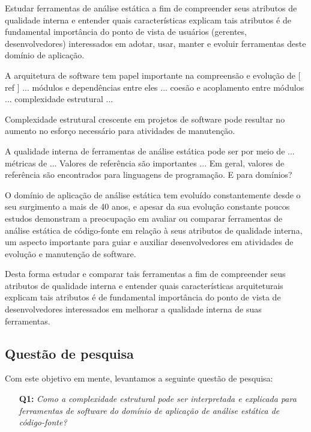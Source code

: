 Estudar ferramentas de análise estática a fim de compreender seus atributos de
qualidade interna e entender quais características %
explicam tais atributos é de fundamental importância do 
ponto de vista de usuários (gerentes, desenvolvedores) interessados
em adotar, usar, manter e evoluir ferramentas deste domínio de aplicação.

A arquitetura de software tem papel importante na compreensão e evolução 
de [ ref ] ...
módulos e dependências entre eles ... coesão e acoplamento entre módulos ...
complexidade estrutural ...
 
Complexidade estrutural crescente em projetos de software pode resultar
no aumento no esforço necessário para atividades de manutenção.

A qualidade interna de ferramentas de análise estática pode ser 
por meio de ... métricas de ... 
Valores de referência são importantes ...
Em geral, valores de referência são encontrados para linguagens de programação.
E para domínios?


O domínio de aplicação de análise estática tem evoluído constantemente desde o
seu surgimento a mais de 40 anos, e apesar da sua evolução constante poucos
estudos demonstram a preocupação em avaliar ou comparar ferramentas de análise
estática de código-fonte em relação à seus atributos de qualidade interna, um
aspecto importante para guiar e auxiliar desenvolvedores em atividades de
evolução e manutenção de software.

Desta forma estudar e comparar tais ferramentas a fim de compreender seus
atributos de qualidade interna e entender quais características arquiteturais
explicam tais atributos é de fundamental importância do ponto de vista de
desenvolvedores interessados em melhorar a qualidade interna de suas
ferramentas.

\subsection{Questão de pesquisa}

Com este objetivo em mente, levantamos a seguinte questão de pesquisa:

\begin{enumerate}
  \item [{\bf Q1:}] {\em Como a complexidade estrutural pode ser interpretada
    e explicada para ferramentas de software do domínio de aplicação de
    análise estática de código-fonte?}
\end{enumerate}

